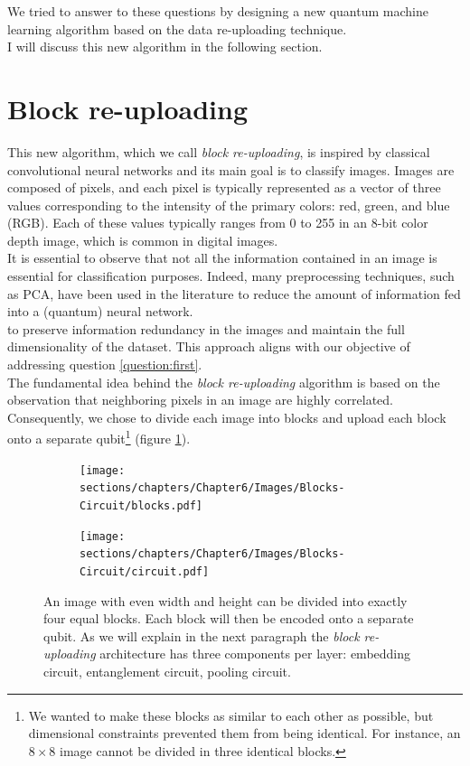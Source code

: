 We tried to answer to these questions by designing a new quantum machine learning algorithm based on the
data re-uploading technique.\\
I will discuss this new algorithm in the following section.

\section{Block re-uploading}

This new algorithm, which we call \textit{block re-uploading}, is inspired by classical convolutional neural 
networks and its main goal is to classify images.
Images are composed of pixels, and each pixel is typically represented as a vector of three 
values corresponding to the intensity of the primary colors: red, green, and blue (RGB). 
Each of these values typically ranges from 0 to 255 in an 8-bit color depth image, which is common in 
digital images.\\
It is essential to observe that not all the information contained in an image is essential for
classification purposes.
Indeed, many preprocessing techniques, such as PCA, have been used in the literature to reduce 
the amount of information fed into a (quantum) neural network.\\
to preserve information redundancy in the images and maintain the full dimensionality of the dataset. 
This approach aligns with our objective of addressing question \ref{question:first}.\\

The fundamental idea behind the \textit{block re-uploading} algorithm is based on the observation that 
neighboring pixels in an image are highly correlated. 
Consequently, we chose to divide each image into blocks and upload each block onto a separate qubit\footnote[1]{We wanted to make these blocks as similar to each other as possible, but dimensional constraints 
prevented them from being identical. For instance, an $8\times8$ image cannot be divided in three
identical blocks.} (figure \ref{fig:block}).\\

\begin{figure}[h]
    \centering
    \begin{subfigure}[b]{0.45\textwidth}
        \centering
        \texttt{[image: sections/chapters/Chapter6/Images/Blocks-Circuit/blocks.pdf]}
    \end{subfigure}
    \begin{subfigure}[b]{0.45\textwidth}
        \centering
        \texttt{[image: sections/chapters/Chapter6/Images/Blocks-Circuit/circuit.pdf]}
    \end{subfigure}
    \caption{An image with even width and height can be divided into exactly four equal blocks. 
    Each block will then be encoded onto a separate qubit. As we will explain in the next paragraph the 
    \textit{block re-uploading} architecture has three components per layer: embedding circuit, 
    entanglement circuit, pooling circuit.}
    \label{fig:block}
\end{figure}

